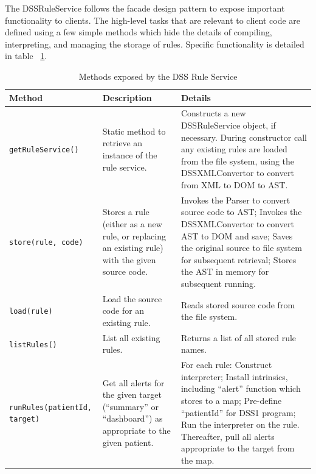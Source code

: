 \documentclass[12pt,letterpaper]{article}
\begin{document}
{The DSSRuleService follows the facade design pattern to expose important functionality to clients. The high-level tasks that are relevant to client code are defined using a few simple methods which hide the details of compiling, interpreting, and managing the storage of rules. Specific functionality is detailed in table ~\ref{tab:RULE_SERVICE}.

\begin{table}
\begin{center}
\begin{tabular}{ l | p{1.25in} | p{2.25in} }
Method & Description & Details \\ \hline

\texttt{getRuleService()}
&
Static method to retrieve an instance of the rule service.
&
Constructs a new DSSRuleService object, if necessary. During 
constructor call any existing rules are loaded from the file 
system, using the DSSXMLConvertor to convert from XML to DOM to AST.
\\ \hline

\texttt{store(rule, code)}
&
Stores a rule (either as a new rule, or replacing an existing rule) with the given source code.
&
Invokes the Parser to convert source code to AST; 
Invokes the DSSXMLConvertor to convert AST to DOM and save; 
Saves the original source to file system for subsequent retrieval; 
Stores the AST in memory for subsequent running.
\\ \hline

\texttt{load(rule)}
&
Load the source code for an existing rule.
&
Reads stored source code from the file system.
\\ \hline

\texttt{listRules()}
&
List all existing rules.
&
Returns a list of all stored rule names.
\\ \hline

\texttt{runRules(patientId, target)}
&
Get all alerts for the given target (“summary” or “dashboard”) as appropriate to the given patient.
&
For each rule:
Construct interpreter; 
Install intrinsics, including “alert” function which stores to a map;
Pre-define “patientId” for DSS1 program;
Run the interpreter on the rule.
Thereafter, pull all alerts appropriate to the target from the map.
\\ \hline

\end{tabular}
\end{center}
\caption{Methods exposed by the DSS Rule Service}
\label{tab:RULE_SERVICE}
\end{table}

}
\end{document}
